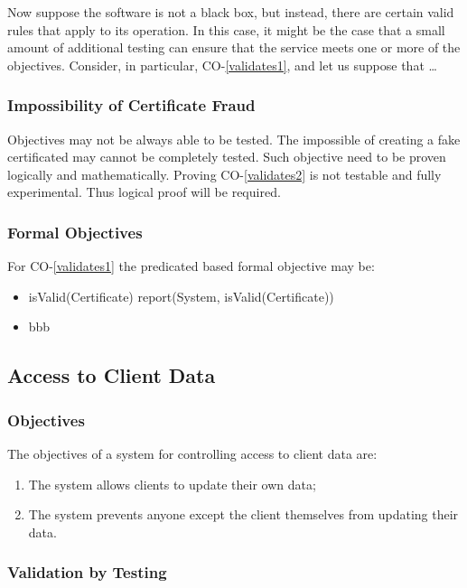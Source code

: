 \documentclass[journal]{IEEEtran}
\begin{document}
Now suppose the software is not a black box, but instead, there
are certain valid rules that apply to its operation. In this case,
it might be the case that a small amount of additional testing
can ensure that the service meets one or more of the objectives.
Consider, in particular, CO-\ref{validates1}, and let us suppose
that \dots

\subsubsection{Impossibility of Certificate Fraud}
Objectives may not be always able to be tested. The impossible of 
creating a fake certificated may cannot be completely tested.
Such objective need to be proven logically and mathematically.
Proving CO-\ref{validates2} is not testable and fully experimental.
Thus logical proof will be required.

\subsubsection{Formal Objectives} 
For CO-\ref{validates1} the predicated based formal objective may be:

\begin{itemize}
  \item\label{validates1proof} isValid(Certificate) \supset report(System, isValid(Certificate))
  \item\label{validates2proof} bbb
\end{itemize}

\subsection{Access to Client Data}

\subsubsection{Objectives}

The objectives of a system for controlling access to client data are:
\begin{enumerate}[DO-1]
  \item The system allows clients to update their own data;
  \item The system prevents anyone except the client themselves from updating their data.
\end{enumerate}

\subsubsection{Validation by Testing}
\end{document}
